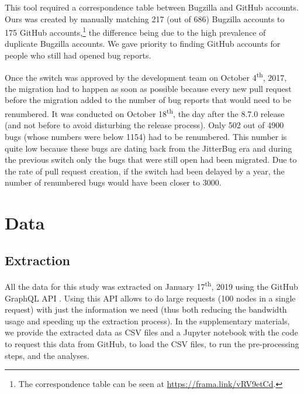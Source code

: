 \documentclass[conference]{IEEEtran}
\begin{document}
This tool required a correspondence table between Bugzilla and GitHub accounts. Ours was created by manually matching 217 (out of 686) Bugzilla accounts to 175 GitHub accounts,\footnote{The correspondence table can be seen at \url{https://frama.link/vRV9etCd}.} the difference being due to the high prevalence of duplicate Bugzilla accounts. We gave priority to finding GitHub accounts for people who still had opened bug reports.

Once the switch was approved by the development team on October 4\textsuperscript{th}, 2017, the migration had to happen as soon as possible because every new pull request before the migration added to the number of bug reports that would need to be renumbered. It was conducted %
on October 18\textsuperscript{th},  the day after the 8.7.0 release (and not before to avoid disturbing the release process). Only 502 out of 4900 bugs (whose numbers were below 1154) had to be renumbered. This number is quite low because these bugs are dating back from the JitterBug era and during the previous switch only the bugs that were still open had been migrated.
Due to the rate of pull request creation, if the switch had been delayed by a year, the number of renumbered bugs would have been closer to 3000.

\section{Data}
\label{data}

\subsection{Extraction}

All the data for this study was extracted on January 17\textsuperscript{th}, 2019 using the GitHub GraphQL API \cite{github_graphql_API}. Using this API allows to do large requests (100 nodes in a single request) with just the information we need (thus both reducing the bandwidth usage and speeding up the extraction process). In the supplementary materials, we provide the extracted data as CSV files and a Jupyter notebook with the code to request this data from GitHub, to load the CSV files, to run the pre-processing steps, and the analyses.%
\end{document}
